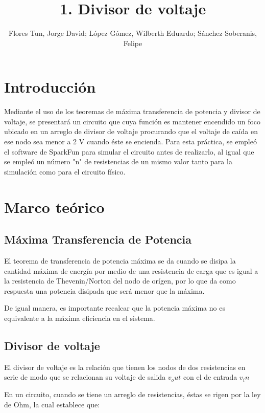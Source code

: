 \documentclass[]{article}
\title{1. Divisor de voltaje}
\author{Flores Tun, Jorge David; López Gómez, Wilberth Eduardo; Sánchez Soberanis, Felipe}
\begin{document}
\maketitle

\begin{abstract}
\end{abstract}

\section{Introducción}

Mediante el uso de los teoremas de máxima transferencia de potencia y divisor de voltaje, se presentará un circuito que cuya función es mantener encendido un foco ubicado en un 
arreglo de divisor de voltaje procurando que el voltaje de caída en ese nodo sea menor a 2 V cuando éste se encienda. Para esta práctica, se empleó el software de SparkFun para 
simular el circuito antes de realizarlo, al igual que se empleó un número "n" de resistencias de un mismo valor tanto para la simulación como para el circuito físico.

\section{Marco teórico}

\subsection{Máxima Transferencia de Potencia}

El teorema de transferencia de potencia máxima se da cuando se disipa la cantidad máxima de energía por medio de una resistencia de carga que es igual a la resistencia de Thevenin/Norton
del nodo de orígen, por lo que da como respuesta una potencia disipada que será menor que la máxima. 

De igual manera, es importante recalcar que la potencia máxima no es equivalente a la máxima eficiencia en el sistema.

\subsection{Divisor de voltaje}

El divisor de voltaje es la relación que tienen los nodos de dos resistencias en serie de modo que se relacionan su voltaje de salida $v_out$ con el de entrada $v_in$

En un circuito, cuando se tiene un arreglo de resistencias, éstas se rigen por la ley de Ohm, la cual establece que:
\end{document}
